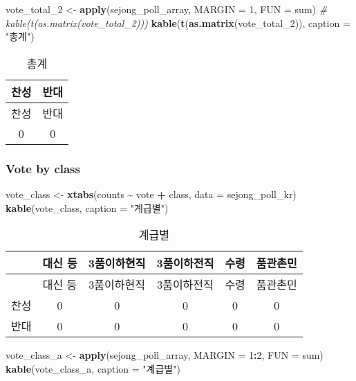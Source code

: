 \documentclass[
]{article}
\newenvironment{Shaded}{\begin{snugshade}}{\end{snugshade}}
\newcommand{\CommentTok}[1]{\textcolor[rgb]{0.56,0.35,0.01}{\textit{#1}}}
\newcommand{\DataTypeTok}[1]{\textcolor[rgb]{0.13,0.29,0.53}{#1}}
\newcommand{\DecValTok}[1]{\textcolor[rgb]{0.00,0.00,0.81}{#1}}
\newcommand{\KeywordTok}[1]{\textcolor[rgb]{0.13,0.29,0.53}{\textbf{#1}}}
\newcommand{\NormalTok}[1]{#1}
\newcommand{\OperatorTok}[1]{\textcolor[rgb]{0.81,0.36,0.00}{\textbf{#1}}}
\newcommand{\StringTok}[1]{\textcolor[rgb]{0.31,0.60,0.02}{#1}}
\begin{document}
\begin{Shaded}
\begin{Highlighting}[]
\NormalTok{vote\_total\_}\DecValTok{2}\NormalTok{ \textless{}{-}}\StringTok{ }\KeywordTok{apply}\NormalTok{(sejong\_poll\_array, }
                      \DataTypeTok{MARGIN =} \DecValTok{1}\NormalTok{, }
                      \DataTypeTok{FUN =}\NormalTok{ sum)}
\CommentTok{\# kable(t(as.matrix(vote\_total\_2)))}
\KeywordTok{kable}\NormalTok{(}\KeywordTok{t}\NormalTok{(}\KeywordTok{as.matrix}\NormalTok{(vote\_total\_}\DecValTok{2}\NormalTok{)), }
      \DataTypeTok{caption =} \StringTok{"총계"}\NormalTok{)}
\end{Highlighting}
\end{Shaded}

\begin{longtable}[]{@{}cc@{}}
\caption{총계}\tabularnewline
\toprule
찬성 & 반대\tabularnewline
\midrule
\endfirsthead
\toprule
찬성 & 반대\tabularnewline
\midrule
\endhead
0 & 0\tabularnewline
\bottomrule
\end{longtable}

\hypertarget{vote-by-class}{%
\subsubsection{Vote by class}\label{vote-by-class}}

\begin{Shaded}
\begin{Highlighting}[]
\NormalTok{vote\_class \textless{}{-}}\StringTok{ }\KeywordTok{xtabs}\NormalTok{(counts }\OperatorTok{\textasciitilde{}}\StringTok{ }\NormalTok{vote }\OperatorTok{+}\StringTok{ }\NormalTok{class, }
                    \DataTypeTok{data =}\NormalTok{ sejong\_poll\_kr)}
\KeywordTok{kable}\NormalTok{(vote\_class, }
      \DataTypeTok{caption =} \StringTok{"계급별"}\NormalTok{)}
\end{Highlighting}
\end{Shaded}

\begin{longtable}[]{@{}lccccc@{}}
\caption{계급별}\tabularnewline
\toprule
& 대신 등 & 3품이하현직 & 3품이하전직 & 수령 & 품관촌민\tabularnewline
\midrule
\endfirsthead
\toprule
& 대신 등 & 3품이하현직 & 3품이하전직 & 수령 & 품관촌민\tabularnewline
\midrule
\endhead
찬성 & 0 & 0 & 0 & 0 & 0\tabularnewline
반대 & 0 & 0 & 0 & 0 & 0\tabularnewline
\bottomrule
\end{longtable}

\begin{Shaded}
\begin{Highlighting}[]
\NormalTok{vote\_class\_a \textless{}{-}}\StringTok{ }\KeywordTok{apply}\NormalTok{(sejong\_poll\_array, }
                      \DataTypeTok{MARGIN =} \DecValTok{1}\OperatorTok{:}\DecValTok{2}\NormalTok{, }
                      \DataTypeTok{FUN =}\NormalTok{ sum)}
\KeywordTok{kable}\NormalTok{(vote\_class\_a, }
      \DataTypeTok{caption =} \StringTok{"계급별"}\NormalTok{)}
\end{Highlighting}
\end{Shaded}
\end{document}
